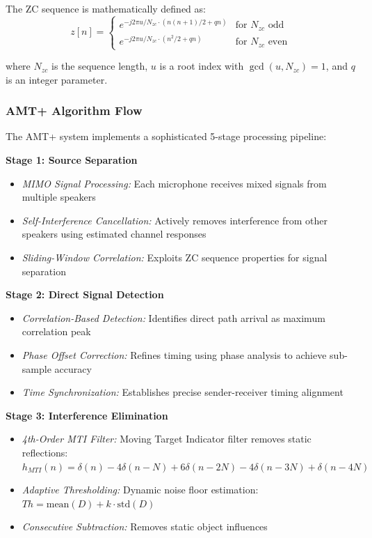 \documentclass[a4paper]{article}
\begin{document}
The ZC sequence is mathematically defined as:
\begin{equation}
z[n] = \begin{cases}
e^{-j2\pi u/N_{zc} \cdot (n(n+1)/2 + qn)} & \text{for } N_{zc} \text{ odd} \\
e^{-j2\pi u/N_{zc} \cdot (n^2/2 + qn)} & \text{for } N_{zc} \text{ even}
\end{cases}
\label{eq:zc_sequence}
\end{equation}

where $N_{zc}$ is the sequence length, $u$ is a root index with $\gcd(u, N_{zc}) = 1$, and $q$ is an integer parameter.

\subsubsection{AMT+ Algorithm Flow}

The AMT+ system implements a sophisticated 5-stage processing pipeline:

{\bf Stage 1: Source Separation}
\begin{itemize}
\item {\em MIMO Signal Processing:} Each microphone receives mixed signals from multiple speakers
\item {\em Self-Interference Cancellation:} Actively removes interference from other speakers using estimated channel responses
\item {\em Sliding-Window Correlation:} Exploits ZC sequence properties for signal separation
\end{itemize}

{\bf Stage 2: Direct Signal Detection}
\begin{itemize}
\item {\em Correlation-Based Detection:} Identifies direct path arrival as maximum correlation peak
\item {\em Phase Offset Correction:} Refines timing using phase analysis to achieve sub-sample accuracy
\item {\em Time Synchronization:} Establishes precise sender-receiver timing alignment
\end{itemize}

{\bf Stage 3: Interference Elimination}
\begin{itemize}
\item {\em 4th-Order MTI Filter:} Moving Target Indicator filter removes static reflections: $h_{MTI}(n) = \delta(n) - 4\delta(n-N) + 6\delta(n-2N) - 4\delta(n-3N) + \delta(n-4N)$
\item {\em Adaptive Thresholding:} Dynamic noise floor estimation: $Th = \text{mean}(D) + k \cdot \text{std}(D)$
\item {\em Consecutive Subtraction:} Removes static object influences
\end{itemize}
\end{document}
